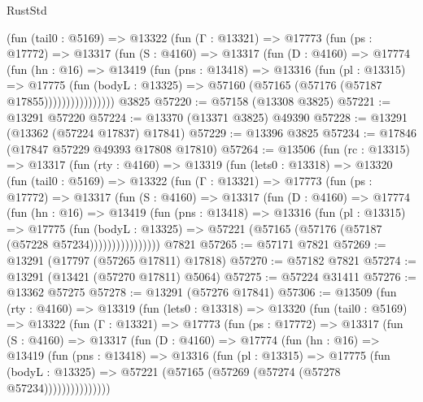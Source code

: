 \begin{lexlean}{RustStd}
\begin{coremodule}
            (fun (tail0 : @5169) =>
            @13322
              (fun (Γ : @13321) =>
              @17773
                (fun (ps : @17772) =>
                @13317
                  (fun (S : @4160) =>
                  @13317
                    (fun (D : @4160) =>
                    @17774
                      (fun (hn : @16) =>
                      @13419
                        (fun (pns : @13418) =>
                        @13316
                          (fun (pl : @13315) =>
                          @17775
                            (fun (bodyL : @13325) =>
                            @57160 (@57165 (@57176 (@57187 @17855))))))))))))))))
    @3825
@57220 := @57158 (@13308 @3825)
@57221 := @13291 @57220
@57224 := @13370 (@13371 @3825) @49390
@57228 := @13291 (@13362 (@57224 @17837) @17841)
@57229 := @13396 @3825
@57234 := @17846 (@17847 @57229 @49393 @17808 @17810)
@57264 := @13506
    (fun (rc : @13315) =>
    @13317
      (fun (rty : @4160) =>
      @13319
        (fun (lets0 : @13318) =>
        @13320
          (fun (tail0 : @5169) =>
          @13322
            (fun (Γ : @13321) =>
            @17773
              (fun (ps : @17772) =>
              @13317
                (fun (S : @4160) =>
                @13317
                  (fun (D : @4160) =>
                  @17774
                    (fun (hn : @16) =>
                    @13419
                      (fun (pns : @13418) =>
                      @13316
                        (fun (pl : @13315) =>
                        @17775
                          (fun (bodyL : @13325) =>
                          @57221 (@57165 (@57176 (@57187 (@57228 @57234))))))))))))))))
    @7821
@57265 := @57171 @7821
@57269 := @13291 (@17797 (@57265 @17811) @17818)
@57270 := @57182 @7821
@57274 := @13291 (@13421 (@57270 @17811) @5064)
@57275 := @57224 @31411
@57276 := @13362 @57275
@57278 := @13291 (@57276 @17841)
@57306 := @13509
    (fun (rty : @4160) =>
    @13319
      (fun (lets0 : @13318) =>
      @13320
        (fun (tail0 : @5169) =>
        @13322
          (fun (Γ : @13321) =>
          @17773
            (fun (ps : @17772) =>
            @13317
              (fun (S : @4160) =>
              @13317
                (fun (D : @4160) =>
                @17774
                  (fun (hn : @16) =>
                  @13419
                    (fun (pns : @13418) =>
                    @13316
                      (fun (pl : @13315) =>
                      @17775
                        (fun (bodyL : @13325) =>
                        @57221 (@57165 (@57269 (@57274 (@57278 @57234)))))))))))))))

\end{coremodule}
\end{lexlean}
